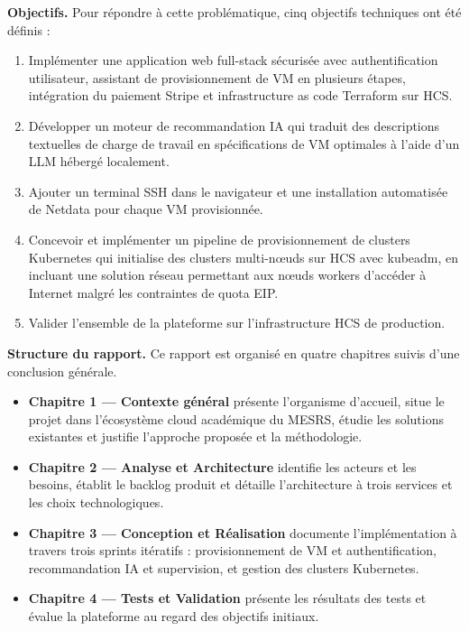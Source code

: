 \textbf{Objectifs.} Pour répondre à cette problématique, cinq objectifs techniques
ont été définis :
\begin{enumerate}
  \item Implémenter une application web full-stack sécurisée avec authentification
        utilisateur, assistant de provisionnement de VM en plusieurs étapes, intégration
        du paiement Stripe et infrastructure as code Terraform sur HCS.
  \item Développer un moteur de recommandation IA qui traduit des descriptions
        textuelles de charge de travail en spécifications de VM optimales à l'aide
        d'un LLM hébergé localement.
  \item Ajouter un terminal SSH dans le navigateur et une installation automatisée
        de Netdata pour chaque VM provisionnée.
  \item Concevoir et implémenter un pipeline de provisionnement de clusters Kubernetes
        qui initialise des clusters multi-nœuds sur HCS avec kubeadm, en incluant une
        solution réseau permettant aux nœuds workers d'accéder à Internet malgré les
        contraintes de quota EIP.
  \item Valider l'ensemble de la plateforme sur l'infrastructure HCS de production.
\end{enumerate}

\textbf{Structure du rapport.} Ce rapport est organisé en quatre chapitres suivis
d'une conclusion générale.

\begin{itemize}
  \item \textbf{Chapitre 1 --- Contexte général} présente l'organisme d'accueil,
        situe le projet dans l'écosystème cloud académique du MESRS, étudie les
        solutions existantes et justifie l'approche proposée et la méthodologie.

  \item \textbf{Chapitre 2 --- Analyse et Architecture} identifie les acteurs et
        les besoins, établit le backlog produit et détaille l'architecture à trois
        services et les choix technologiques.

  \item \textbf{Chapitre 3 --- Conception et Réalisation} documente l'implémentation
        à travers trois sprints itératifs : provisionnement de VM et authentification,
        recommandation IA et supervision, et gestion des clusters Kubernetes.

  \item \textbf{Chapitre 4 --- Tests et Validation} présente les résultats des tests
        et évalue la plateforme au regard des objectifs initiaux.
\end{itemize}
